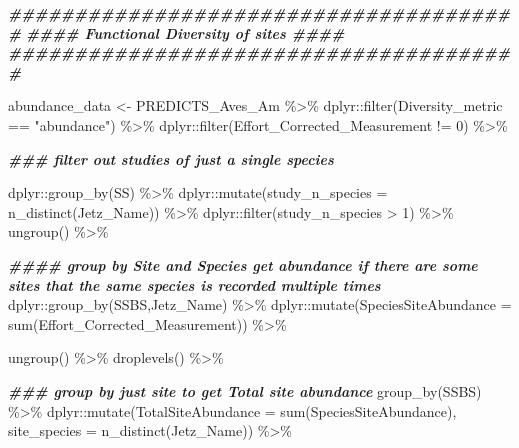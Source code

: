 \documentclass[
]{article}
\newenvironment{Shaded}{\begin{snugshade}}{\end{snugshade}}
\newcommand{\AttributeTok}[1]{\textcolor[rgb]{0.77,0.63,0.00}{#1}}
\newcommand{\DecValTok}[1]{\textcolor[rgb]{0.00,0.00,0.81}{#1}}
\newcommand{\DocumentationTok}[1]{\textcolor[rgb]{0.56,0.35,0.01}{\textbf{\textit{#1}}}}
\newcommand{\FunctionTok}[1]{\textcolor[rgb]{0.00,0.00,0.00}{#1}}
\newcommand{\NormalTok}[1]{#1}
\newcommand{\OtherTok}[1]{\textcolor[rgb]{0.56,0.35,0.01}{#1}}
\newcommand{\SpecialCharTok}[1]{\textcolor[rgb]{0.00,0.00,0.00}{#1}}
\newcommand{\StringTok}[1]{\textcolor[rgb]{0.31,0.60,0.02}{#1}}
\begin{document}
\begin{Shaded}
\begin{Highlighting}[]
\DocumentationTok{\#\#\#\#\#\#\#\#\#\#\#\#\#\#\#\#\#\#\#\#\#\#\#\#\#\#\#\#\#\#\#\#\#\#\#\#\#\#\#}
\DocumentationTok{\#\#\#\# Functional Diversity of sites \#\#\#\#}
\DocumentationTok{\#\#\#\#\#\#\#\#\#\#\#\#\#\#\#\#\#\#\#\#\#\#\#\#\#\#\#\#\#\#\#\#\#\#\#\#\#\#\#}

\NormalTok{abundance\_data }\OtherTok{\textless{}{-}}\NormalTok{ PREDICTS\_Aves\_Am }\SpecialCharTok{\%\textgreater{}\%}\NormalTok{ dplyr}\SpecialCharTok{::}\FunctionTok{filter}\NormalTok{(Diversity\_metric }\SpecialCharTok{==} \StringTok{"abundance"}\NormalTok{) }\SpecialCharTok{\%\textgreater{}\%}\NormalTok{ dplyr}\SpecialCharTok{::}\FunctionTok{filter}\NormalTok{(Effort\_Corrected\_Measurement }\SpecialCharTok{!=} \DecValTok{0}\NormalTok{) }\SpecialCharTok{\%\textgreater{}\%}
  
  \DocumentationTok{\#\#\# filter out studies of just a single species }
  
\NormalTok{  dplyr}\SpecialCharTok{::}\FunctionTok{group\_by}\NormalTok{(SS) }\SpecialCharTok{\%\textgreater{}\%}\NormalTok{ dplyr}\SpecialCharTok{::}\FunctionTok{mutate}\NormalTok{(}\AttributeTok{study\_n\_species =} \FunctionTok{n\_distinct}\NormalTok{(Jetz\_Name)) }\SpecialCharTok{\%\textgreater{}\%}\NormalTok{ dplyr}\SpecialCharTok{::}\FunctionTok{filter}\NormalTok{(study\_n\_species }\SpecialCharTok{\textgreater{}} \DecValTok{1}\NormalTok{) }\SpecialCharTok{\%\textgreater{}\%} \FunctionTok{ungroup}\NormalTok{() }\SpecialCharTok{\%\textgreater{}\%}  
  
  \DocumentationTok{\#\#\#\# group by Site and Species get abundance if there are some sites that the same species is recorded multiple times }
\NormalTok{  dplyr}\SpecialCharTok{::}\FunctionTok{group\_by}\NormalTok{(SSBS,Jetz\_Name) }\SpecialCharTok{\%\textgreater{}\%}\NormalTok{ dplyr}\SpecialCharTok{::}\FunctionTok{mutate}\NormalTok{(}\AttributeTok{SpeciesSiteAbundance =} \FunctionTok{sum}\NormalTok{(Effort\_Corrected\_Measurement)) }\SpecialCharTok{\%\textgreater{}\%}
  
  
  \FunctionTok{ungroup}\NormalTok{() }\SpecialCharTok{\%\textgreater{}\%}   \FunctionTok{droplevels}\NormalTok{() }\SpecialCharTok{\%\textgreater{}\%}
  
  \DocumentationTok{\#\#\# group by just site to get Total site abundance}
  \FunctionTok{group\_by}\NormalTok{(SSBS) }\SpecialCharTok{\%\textgreater{}\%}\NormalTok{ dplyr}\SpecialCharTok{::}\FunctionTok{mutate}\NormalTok{(}\AttributeTok{TotalSiteAbundance =} \FunctionTok{sum}\NormalTok{(SpeciesSiteAbundance), }\AttributeTok{site\_species =} \FunctionTok{n\_distinct}\NormalTok{(Jetz\_Name)) }\SpecialCharTok{\%\textgreater{}\%}
  

\end{Highlighting}
\end{Shaded}
\end{document}
